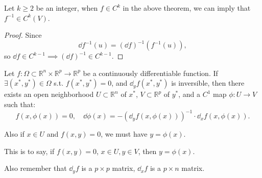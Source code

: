 \begin{corollary}
    Let $k\ge 2$ be an integer, when $f\in C^k$ in the above theorem,
	we can imply that $f^{-1}\in C^k(V)$.
\end{corollary}
\begin{proof}[Proof]
	Since
    \[
	\dd f^{-1}(u) = (\dd f)^{-1} (f^{-1} (u)),
	\]
	so $\dd f\in C^{k-1}\implies (\dd f)^{-1} \in C^{k-1}$.
\end{proof}

\begin{theorem}
    Let $f: \Omega \subset \mathbb{R}^n\times \mathbb{R}^p \to \mathbb{R}^p$ be
	a continuously differentiable function.
	If $\exists (x^*, y^*)\in \Omega$ s.t. $f(x^*, y^*) = 0$, and
	$\dd_y f(x^*, y^*)$ is inversible, then there exists an open
	neighborhood $U \subset \mathbb{R}^n$ of $x^*$,
	$V \subset \mathbb{R}^p$ of $y^*$, and a $C^1$ map $\phi: U\to V$ such
	that:
	\[
	f(x, \phi(x)) = 0,\quad \dd \phi(x) = -(\dd_y f(x, \phi(x)))^{-1}\cdot
	\dd_x f(x, \phi(x)).
	\]

	Also if $x\in U$ and $f(x,y) = 0$, we must have $y = \phi(x)$.
\end{theorem}
\begin{remark}
    This is to say, if $f(x,y) = 0$, $x\in U, y\in V$, then $y = \phi(x)$.

	Also remember that $\dd_y f$ is a $p \times p$ matrix,
	$\dd_x f$ is a $p \times  n$ matrix.
\end{remark}
